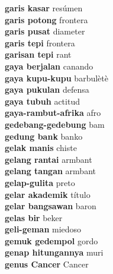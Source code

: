 \textbf{ garis kasar  } resúmen \\
\textbf{ garis potong  } frontera \\
\textbf{ garis pusat  } diameter \\
\textbf{ garis tepi  } frontera \\
\textbf{ garisan tepi  } rant \\
\textbf{ gaya berjalan  } canando \\
\textbf{ gaya kupu-kupu  } barbulètè \\
\textbf{ gaya pukulan  } defensa \\
\textbf{ gaya tubuh  } actitud \\
\textbf{ gaya-rambut-afrika  } afro \\
\textbf{ gedebang-gedebung  } bam \\
\textbf{ gedung bank  } banko \\
\textbf{ gelak manis  } chiste \\
\textbf{ gelang rantai  } armbant \\
\textbf{ gelang tangan  } armbant \\
\textbf{ gelap-gulita  } preto \\
\textbf{ gelar akademik  } título \\
\textbf{ gelar bangsawan  } baron \\
\textbf{ gelas bir  } beker \\
\textbf{ geli-geman  } miedoso \\
\textbf{ gemuk gedempol  } gordo \\
\textbf{ genap hitungannya  } muri \\
\textbf{ genus Cancer  } Cancer \\
